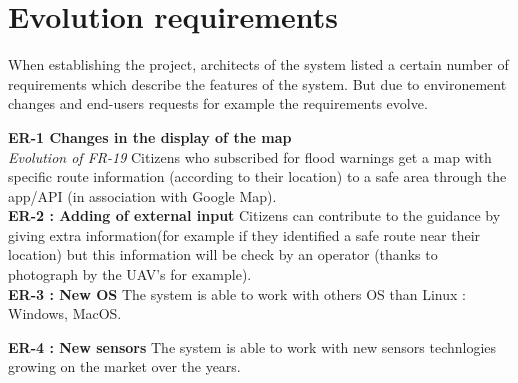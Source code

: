 \section{Evolution requirements}
When establishing the project, architects of the system listed a certain number of requirements which describe the features of the system. But due to environement changes and end-users requests for example the requirements evolve.

\textbf{ER-1 Changes in the display of the map } \\
\textit { Evolution of FR-19 } Citizens who subscribed for flood warnings get a map with specific route information (according to their location) to a safe area through the app/API (in association with Google Map). \\

\textbf{ER-2 : Adding of external input} Citizens can contribute to the guidance by giving extra information(for example if they identified a safe route near their location) but this information will be check by an operator (thanks to photograph by the UAV's for example). \\

\textbf{ER-3 : New OS } The system is able to work with others OS than Linux : Windows, MacOS. %


\textbf{ER-4 : New sensors } The system is able to work with new sensors technlogies growing on the market over the years.